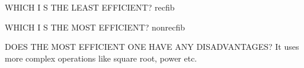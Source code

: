 \documentclass{article}
\begin{document}
\begin{maplegroup}
\begin{mapleinput}
\end{mapleinput}

\begin{flushleft}
WHICH I S THE LEAST EFFICIENT?       recfib
\end{flushleft}

\begin{flushleft}
WHICH I S THE MOST EFFICIENT?       nonrecfib
\end{flushleft}

\begin{flushleft}
DOES THE MOST EFFICIENT ONE HAVE ANY DISADVANTAGES?   It uses more
complex operations like square root, power etc.
\end{flushleft}

\end{maplegroup}
\end{document}
